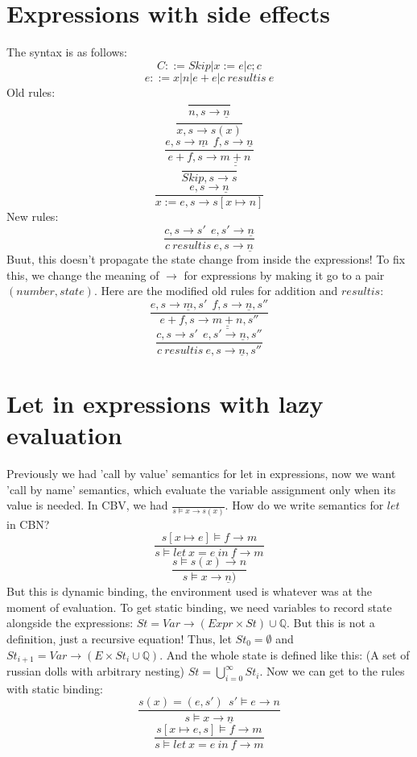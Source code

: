 \documentclass{article}
\begin{document}
\section{Expressions with side effects}
The syntax is as follows:
$$C::=Skip | x:=e | c;c$$$$e::=x|n|e+e|c\ resultis\ e$$
Old rules:
$$\frac{}{n,s\rightarrow \underline{n}}$$
$$\frac{}{x,s\rightarrow s(x)}$$
$$\frac{e,s\rightarrow \underline{m}\ \ f,s\rightarrow \underline{n}}{e+f,s\rightarrow \underline{\underline{m+n}}}$$
$$\frac{}{Skip,s\rightarrow s}$$
$$\frac{e,s\rightarrow \underline{n}}{x:=e,s\rightarrow s[x\mapsto n]}$$
New rules:
$$\frac{c,s\rightarrow s'\ \ e,s'\rightarrow \underline{n}}{c\ resultis\ e,s\rightarrow \underline{n}}$$
Buut, this doesn't propagate the state change from inside the expressions! To fix this, we change the meaning of $ \rightarrow $ for expressions by making it go to a pair $ (number, state)$. Here are the modified old rules for addition and $resultis$:
$$\frac{e,s\rightarrow \underline{m}, s'\ \ f,s\rightarrow \underline{n}, s''}{e+f,s\rightarrow \underline{\underline{m+n}}, s''}$$
$$\frac{c,s\rightarrow s'\ \ e,s'\rightarrow \underline{n}, s''}{c\ resultis\ e,s\rightarrow \underline{n}, s''}$$

\section{Let in expressions with lazy evaluation}
Previously we had 'call by value' semantics for let in expressions, now we want 'call by name' semantics, which evaluate the variable assignment only when its value is needed. In CBV, we had $\frac{}{s\vDash x\rightarrow s(x)}$. How do we write semantics for $ let $ in CBN?
$$\frac{s[x\mapsto e]\vDash f\rightarrow m}{s\vDash let\ x = e\ in\ f\rightarrow m}$$
$$\frac{s\vDash s(x)\rightarrow n}{s\vDash x\rightarrow \underline{n})}$$
But this is dynamic binding, the environment used is whatever was at the moment of evaluation.
To get static binding, we need variables to record state alongside the expressions: $ St=Var\rightarrow(Expr\times St)\cup \mathbb{Q} $. But this is not a definition, just a recursive equation! Thus, let $St_0=\emptyset$ and $ St_{i+1} = Var\rightarrow(E\times St_i \cup \mathbb{Q}) $. And the whole state is defined like this: (A set of russian dolls with arbitrary nesting) $ St=\bigcup_{i=0}^\infty St_i $.
Now we can get to the rules with static binding:
$$\frac{s(x)=(e,s')\ \ s'\vDash e\rightarrow n}{s\vDash x\rightarrow \underline{n}}$$
$$\frac{s[x\mapsto e, s]\vDash f\rightarrow m}{s\vDash let\ x = e\ in\ f\rightarrow m}$$
\end{document}
